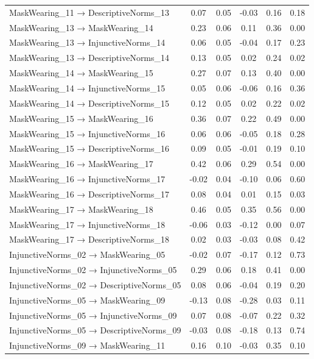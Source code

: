 \documentclass[
  man, donotrepeattitle,floatsintext]{apa6}
\begin{document}
\begin{center}
\begin{ThreePartTable}
{\begin{longtable}{lccccc}
MaskWearing\_11 → DescriptiveNorms\_13 & 0.07 & 0.05 & -0.03 & 0.16 & 0.18\\
MaskWearing\_13 → MaskWearing\_14 & 0.23 & 0.06 & 0.11 & 0.36 & 0.00\\
MaskWearing\_13 → InjunctiveNorms\_14 & 0.06 & 0.05 & -0.04 & 0.17 & 0.23\\
MaskWearing\_13 → DescriptiveNorms\_14 & 0.13 & 0.05 & 0.02 & 0.24 & 0.02\\
MaskWearing\_14 → MaskWearing\_15 & 0.27 & 0.07 & 0.13 & 0.40 & 0.00\\
MaskWearing\_14 → InjunctiveNorms\_15 & 0.05 & 0.06 & -0.06 & 0.16 & 0.36\\
MaskWearing\_14 → DescriptiveNorms\_15 & 0.12 & 0.05 & 0.02 & 0.22 & 0.02\\
MaskWearing\_15 → MaskWearing\_16 & 0.36 & 0.07 & 0.22 & 0.49 & 0.00\\
MaskWearing\_15 → InjunctiveNorms\_16 & 0.06 & 0.06 & -0.05 & 0.18 & 0.28\\
MaskWearing\_15 → DescriptiveNorms\_16 & 0.09 & 0.05 & -0.01 & 0.19 & 0.10\\
MaskWearing\_16 → MaskWearing\_17 & 0.42 & 0.06 & 0.29 & 0.54 & 0.00\\
MaskWearing\_16 → InjunctiveNorms\_17 & -0.02 & 0.04 & -0.10 & 0.06 & 0.60\\
MaskWearing\_16 → DescriptiveNorms\_17 & 0.08 & 0.04 & 0.01 & 0.15 & 0.03\\
MaskWearing\_17 → MaskWearing\_18 & 0.46 & 0.05 & 0.35 & 0.56 & 0.00\\
MaskWearing\_17 → InjunctiveNorms\_18 & -0.06 & 0.03 & -0.12 & 0.00 & 0.07\\
MaskWearing\_17 → DescriptiveNorms\_18 & 0.02 & 0.03 & -0.03 & 0.08 & 0.42\\
InjunctiveNorms\_02 → MaskWearing\_05 & -0.02 & 0.07 & -0.17 & 0.12 & 0.73\\
InjunctiveNorms\_02 → InjunctiveNorms\_05 & 0.29 & 0.06 & 0.18 & 0.41 & 0.00\\
InjunctiveNorms\_02 → DescriptiveNorms\_05 & 0.08 & 0.06 & -0.04 & 0.19 & 0.20\\
InjunctiveNorms\_05 → MaskWearing\_09 & -0.13 & 0.08 & -0.28 & 0.03 & 0.11\\
InjunctiveNorms\_05 → InjunctiveNorms\_09 & 0.07 & 0.08 & -0.07 & 0.22 & 0.32\\
InjunctiveNorms\_05 → DescriptiveNorms\_09 & -0.03 & 0.08 & -0.18 & 0.13 & 0.74\\
InjunctiveNorms\_09 → MaskWearing\_11 & 0.16 & 0.10 & -0.03 & 0.35 & 0.10\\

\end{longtable}}
\end{ThreePartTable}
\end{center}
\end{document}
